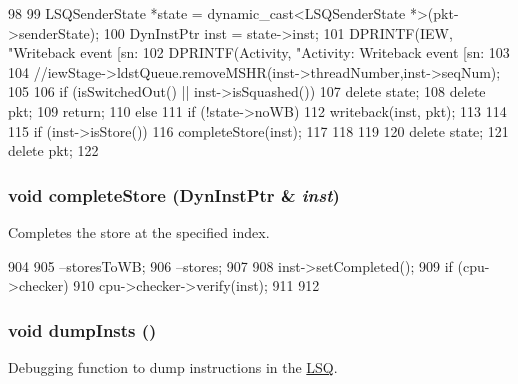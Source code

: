 \begin{DoxyCode}
98 {
99     LSQSenderState *state = dynamic_cast<LSQSenderState *>(pkt->senderState);
100     DynInstPtr inst = state->inst;
101     DPRINTF(IEW, "Writeback event [sn:%
102     DPRINTF(Activity, "Activity: Writeback event [sn:%
103 
104     //iewStage->ldstQueue.removeMSHR(inst->threadNumber,inst->seqNum);
105 
106     if (isSwitchedOut() || inst->isSquashed()) {
107         delete state;
108         delete pkt;
109         return;
110     } else {
111         if (!state->noWB) {
112             writeback(inst, pkt);
113         }
114 
115         if (inst->isStore()) {
116             completeStore(inst);
117         }
118     }
119 
120     delete state;
121     delete pkt;
122 }
\end{DoxyCode}
\hypertarget{classOzoneLWLSQ_a14bf528b217d02373076ed257f448dbf}{
\subsubsection[{completeStore}]{\setlength{\rightskip}{0pt plus 5cm}void completeStore ({\bf DynInstPtr} \& {\em inst})}}
\label{classOzoneLWLSQ_a14bf528b217d02373076ed257f448dbf}
Completes the store at the specified index. 


\begin{DoxyCode}
904 {
905     --storesToWB;
906     --stores;
907 
908     inst->setCompleted();
909     if (cpu->checker) {
910         cpu->checker->verify(inst);
911     }
912 }
\end{DoxyCode}
\hypertarget{classOzoneLWLSQ_a80587b4fe043bbe1995536cb3b361588}{
\subsubsection[{dumpInsts}]{\setlength{\rightskip}{0pt plus 5cm}void dumpInsts ()}}
\label{classOzoneLWLSQ_a80587b4fe043bbe1995536cb3b361588}
Debugging function to dump instructions in the \hyperlink{classLSQ}{LSQ}. 


